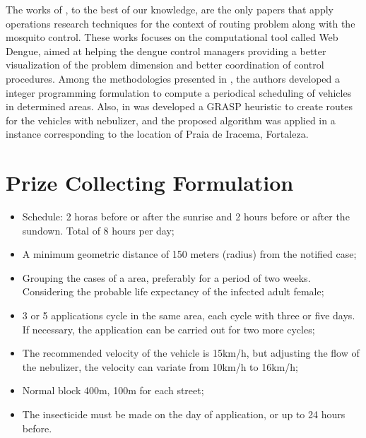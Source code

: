 \documentclass[a4paper,11pt]{article}
\begin{document}
The works of \cite{negreiros:2008,negreiros:2011,negreiros-2020}, to the best of
our knowledge, are the only papers that apply operations research techniques for
the context  of routing  problem along  with the  mosquito control.  These works
focuses on the computational tool called Web Dengue, aimed at helping the dengue
control managers providing  a better visualization of the  problem dimension and
better coordination of control procedures.  Among the methodologies presented in
\cite{negreiros:2008,negreiros:2011},   the   authors    developed   a   integer
programming  formulation  to compute  a  periodical  scheduling of  vehicles  in
determined areas. Also, in \cite{negreiros:2011} was developed a GRASP heuristic
to create routes for the vehicles with nebulizer, and the proposed algorithm was
applied  in a  instance  corresponding  to the  location  of  Praia de  Iracema,
Fortaleza.

\section{Prize Collecting Formulation} \label{sec:formulation}

\begin{itemize}
    \item Schedule: 2 horas before or after the sunrise and 2 hours before or after the sundown. Total of 8 hours per day;
    \item A minimum geometric distance of 150 meters (radius) from the notified case; 
    \item Grouping the cases of a area, preferably for a period of two weeks. Considering the probable life expectancy of the infected adult female;
    \item 3 or 5 applications cycle in the same area, each cycle with three or five days. If necessary, the application can be carried out for two more cycles;
    \item The recommended velocity of the vehicle is 15km/h, but adjusting the flow of the nebulizer, the velocity can variate from 10km/h to 16km/h;
    \item Normal block 400m, 100m for each street;
    \item The insecticide must be made on the day of application, or up to 24 hours before.
\end{itemize}
\end{document}
